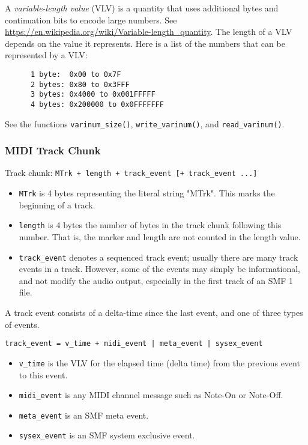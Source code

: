   A \textsl{variable-length value} (VLV) is a quantity that uses additional
   bytes and continuation bits to encode large numbers.
   See \url{https://en.wikipedia.org/wiki/Variable-length\_quantity}.
   The length of a VLV depends on the value it represents.
   Here is a list of the numbers that can be represented by a VLV:

   \begin{verbatim}
      1 byte:  0x00 to 0x7F
      2 bytes: 0x80 to 0x3FFF
      3 bytes: 0x4000 to 0x001FFFFF
      4 bytes: 0x200000 to 0x0FFFFFFF
   \end{verbatim}

   See the functions
   \texttt{varinum\_size()},
   \texttt{write\_varinum()}, and
   \texttt{read\_varinum()}.

\subsubsection{MIDI Track Chunk}
\label{subsubsec:midi_track_chunk}

   Track chunk:
   \texttt{MTrk + length + track\_event [+ track\_event ...]}

   \begin{itemize}
      \item \texttt{MTrk} is 4 bytes representing the literal string "MTrk".
         This marks the beginning of a track.
      \item \texttt{length} is 4 bytes the number of bytes in the track
         chunk following this number.  That is, the marker and length are
         not counted in the length value.
      \item \texttt{track\_event} denotes a sequenced track event; usually
         there are many track events in a track.  However, some of the
         events may simply be informational, and not modify the audio
         output, especially in the first track of an SMF 1 file.
   \end{itemize}

   A track event consists of a delta-time since the last event, and one of
   three types of events.
 
   \texttt{track\_event = v\_time + midi\_event | meta\_event | sysex\_event}
 
   \begin{itemize}
      \item \texttt{v\_time} is the VLV for the elapsed time
         (delta time) from the previous event to this event.
      \item \texttt{midi\_event} is any MIDI channel message such as Note-On
         or Note-Off.
      \item \texttt{meta\_event} is an SMF meta event.
      \item \texttt{sysex\_event} is an SMF system exclusive event.
   \end{itemize}

